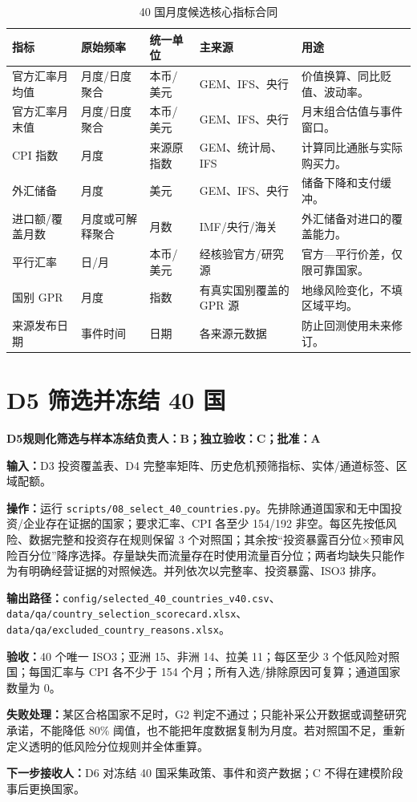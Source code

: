 \documentclass[UTF8,fontset=windows,12pt,openany]{ctexbook}
\newcommand{\File}[1]{{\small\nolinkurl{#1}}}
\newcommand{\StepTitle}[3]{%
  \noindent\colorbox{DeepNavy}{\parbox{0.965\textwidth}{\color{white}\Large\bfseries #1\quad #2\hfill\normalsize #3}}\par\medskip
}
\newcommand{\CardRow}[2]{\noindent\textbf{#1：}#2\par}
\begin{document}
\begin{longtable}{p{3.2cm}p{2.6cm}p{2.5cm}p{2.4cm}p{3.1cm}}
\caption{40 国月度候选核心指标合同}\label{tab:monthly-core}\\
\toprule
\textbf{指标} & \textbf{原始频率} & \textbf{统一单位} & \textbf{主来源} & \textbf{用途}\\
\midrule
官方汇率月均值 & 月度/日度聚合 & 本币/美元 & GEM、IFS、央行 & 价值换算、同比贬值、波动率。\\
官方汇率月末值 & 月度/日度聚合 & 本币/美元 & GEM、IFS、央行 & 月末组合估值与事件窗口。\\
CPI 指数 & 月度 & 来源原指数 & GEM、统计局、IFS & 计算同比通胀与实际购买力。\\
外汇储备 & 月度 & 美元 & GEM、IFS、央行 & 储备下降和支付缓冲。\\
进口额/覆盖月数 & 月度或可解释聚合 & 月数 & IMF/央行/海关 & 外汇储备对进口的覆盖能力。\\
平行汇率 & 日/月 & 本币/美元 & 经核验官方/研究源 & 官方—平行价差，仅限可靠国家。\\
国别 GPR & 月度 & 指数 & 有真实国别覆盖的 GPR 源 & 地缘风险变化，不填区域平均。\\
来源发布日期 & 事件时间 & 日期 & 各来源元数据 & 防止回测使用未来修订。\\
\bottomrule
\end{longtable}

\newpage
\section{D5 筛选并冻结 40 国}
\StepTitle{D5}{规则化筛选与样本冻结}{负责人：B；独立验收：C；批准：A}
\CardRow{输入}{D3 投资覆盖表、D4 完整率矩阵、历史危机预筛指标、实体/通道标签、区域配额。}
\CardRow{操作}{运行 \File{scripts/08_select_40_countries.py}。先排除通道国家和无中国投资/企业存在证据的国家；要求汇率、CPI 各至少 154/192 非空。每区先按低风险、数据完整和投资存在规则保留 3 个对照国；其余按“投资暴露百分位×预审风险百分位”降序选择。存量缺失而流量存在时使用流量百分位；两者均缺失只能作为有明确经营证据的对照候选。并列依次以完整率、投资暴露、ISO3 排序。}
\CardRow{输出路径}{\File{config/selected_40_countries_v40.csv}、\File{data/qa/country_selection_scorecard.xlsx}、\File{data/qa/excluded_country_reasons.xlsx}。}
\CardRow{验收}{40 个唯一 ISO3；亚洲 15、非洲 14、拉美 11；每区至少 3 个低风险对照国；每国汇率与 CPI 各不少于 154 个月；所有入选/排除原因可复算；通道国家数量为 0。}
\CardRow{失败处理}{某区合格国家不足时，G2 判定不通过；只能补采公开数据或调整研究承诺，不能降低 80\% 阈值，也不能把年度数据复制为月度。若对照国不足，重新定义透明的低风险分位规则并全体重算。}
\CardRow{下一步接收人}{D6 对冻结 40 国采集政策、事件和资产数据；C 不得在建模阶段事后更换国家。}
\end{document}
